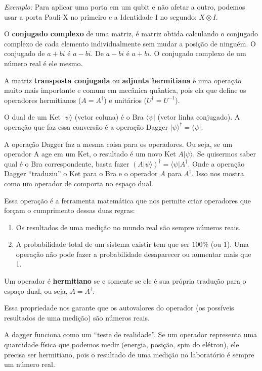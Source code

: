 \documentclass[12pt, a4paper]{article}
\newcommand{\ket}[1]{\lvert #1 \rangle}
\newcommand{\bra}[1]{\langle #1 \rvert}
\begin{document}
\textit{Exemplo:} Para aplicar uma porta em um qubit e não afetar a outro, podemos usar a porta Pauli-X no primeiro e a Identidade I no segundo: $X \otimes I$.

O \textbf{conjugado complexo} de uma matriz, é matriz obtida calculando o conjugado complexo de cada elemento individualmente sem mudar a posição de ninguém. O conjugado de \(a+bi\) é \(a-bi\). De \(a-bi\) é \(a+bi\). O conjugado complexo de um número real é ele mesmo.

A matriz \textbf{transposta conjugada} ou \textbf{adjunta hermitiana} é uma operação muito mais importante e comum em mecânica quântica, pois ela que define os operadores hermitianos (\(A=A^\dagger\)) e unitários (\(U^\dagger = U^{-1}\)).

O dual de um Ket $\ket{\psi}$ (vetor coluna) é o Bra $\bra{\psi}$ (vetor linha conjugado). A operação que faz essa conversão é a operação Dagger \(\ket{\psi}^\dagger = \bra{\psi}\).

A operação Dagger faz a mesma coisa para os operadores. Ou seja, se um operador A age em um Ket, o resultado é um novo Ket $A\ket{\psi}$. Se quisermos saber qual é o Bra correspondente, basta fazer \((A\ket{\psi})^\dagger = \bra{\psi}A^\dagger\). Onde a operação Dagger ``traduziu'' o Ket para o Bra e o operador $A$ para $A^\dagger$. Isso nos mostra como um operador de comporta no espaço dual.

Essa operação é a ferramenta matemática que nos permite criar operadores que forçam o cumprimento dessas duas regras:
\begin{enumerate}
    \item Os resultados de uma medição no mundo real são sempre números reais.
    \item A probabilidade total de um sistema existir tem que ser $100\%$ (ou 1). Uma operação não pode fazer a probabilidade desaparecer ou aumentar mais que 1.
\end{enumerate}

Um operador é \textbf{hermitiano} se e somente se ele é sua própria tradução para o espaço dual, ou seja, $A = A^\dagger$.

Essa propriedade nos garante que os autovalores do operador (os possíveis resultados de uma medição) são números reais.

A dagger funciona como um ``teste de realidade''. Se um operador representa  uma quantidade física que podemos medir (energia, posição, spin do elétron), ele precisa ser hermitiano, pois o resultado de uma medição no laboratório é sempre um número real.
\end{document}
